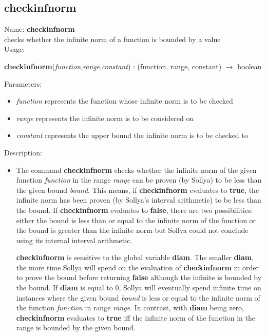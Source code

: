 \subsection{checkinfnorm}
\label{labcheckinfnorm}
\noindent Name: \textbf{checkinfnorm}\\
checks whether the infinite norm of a function is bounded by a value\\

\noindent Usage: 
\begin{center}
\textbf{checkinfnorm}(\emph{function},\emph{range},\emph{constant}) : (\textsf{function}, \textsf{range}, \textsf{constant}) $\rightarrow$ \textsf{boolean}\\
\end{center}
Parameters: 
\begin{itemize}
\item \emph{function} represents the function whose infinite norm is to be checked
\item \emph{range} represents the infinite norm is to be considered on
\item \emph{constant} represents the upper bound the infinite norm is to be checked to
\end{itemize}
\noindent Description: \begin{itemize}

\item The command \textbf{checkinfnorm} checks whether the infinite norm of the given
   function \emph{function} in the range \emph{range} can be proven (by Sollya) to
   be less than the given bound \emph{bound}. This means, if \textbf{checkinfnorm}
   evaluates to \textbf{true}, the infinite norm has been proven (by Sollya's
   interval arithmetic) to be less than the bound. If \textbf{checkinfnorm} evaluates
   to \textbf{false}, there are two possibilities: either the bound is less than
   or equal to the infinite norm of the function or the bound is greater
   than the infinite norm but Sollya could not conclude using its
   internal interval arithmetic.
    
   \textbf{checkinfnorm} is sensitive to the global variable \textbf{diam}. The smaller \textbf{diam},
   the more time Sollya will spend on the evaluation of \textbf{checkinfnorm} in
   order to prove the bound before returning \textbf{false} although the infinite
   is bounded by the bound. If \textbf{diam} is equal to $0$, Sollya will
   eventually spend infinite time on instances where the given bound
   \emph{bound} is less or equal to the infinite norm of the function
   \emph{function} in range \emph{range}. In contrast, with \textbf{diam} being zero,
   \textbf{checkinfnorm} evaluates to \textbf{true} iff the infinite norm of the function in
   the range is bounded by the given bound.
\end{itemize}
